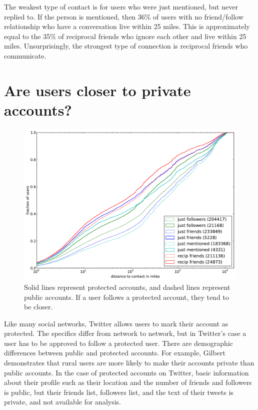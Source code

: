 The weakest type of contact is for users who were just mentioned, but never
replied to. If the person is mentioned, then 36\% of users with no
friend/follow relationship who have a conversation live within 25 miles.
This is approximately equal to the 35\% of reciprocal friends who ignore each
other and live within 25 miles.
Unsurprisingly, the strongest type of connection is reciprocal friends who
communicate.


\section{Are users closer to private accounts?}

\begin{figure}[tb]
\centering
\includegraphics[width=\linewidth]{figures/edge_types_prot.pdf}
\caption{Solid lines represent protected accounts, and dashed lines represent
public accounts. If a user follows a protected account, they tend to be
closer.}
\label{fig:EdgeTypesProt}
\end{figure}

Like many social networks, Twitter allows users to mark their account as
protected. The specifics differ from network to network, but in Twitter's case
a user has to be approved to follow a protected user.
There are demographic differences between public and protected accounts.
For example, Gilbert \cite{gilbert2008network} demonstrates that rural users
are more likely to make their accounts private than public accounts.
In the case of protected accounts on Twitter, basic information
about their profile such as their location and the number of friends and
followers is public, but their friends list, followers list, and the text of
their tweets is private, and not available for analysis.

